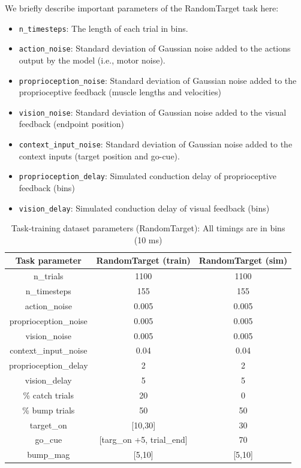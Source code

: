 \documentclass{article}
\begin{document}
We briefly describe important parameters of the RandomTarget task here:
\begin{itemize}
    \item \texttt{n\_timesteps}: The length of each trial in bins.
    \item \texttt{action\_noise}: Standard deviation of Gaussian noise added to the actions output by the model (i.e., motor noise).
    \item \texttt{proprioception\_noise}: Standard deviation of Gaussian noise added to the proprioceptive feedback (muscle lengths and velocities)
    \item \texttt{vision\_noise}: Standard deviation of Gaussian noise added to the visual feedback (endpoint position)
    \item \texttt{context\_input\_noise}: Standard deviation of Gaussian noise added to the context inputs (target position and go-cue).
    \item \texttt{proprioception\_delay}: Simulated conduction delay of proprioceptive feedback (bins)
    \item \texttt{vision\_delay}: Simulated conduction delay of visual feedback (bins)
\end{itemize}
\begin{table}[ht]
\centering
\begin{tabular}{|c|c|c|}
\hline
\textbf{Task parameter} & \textbf{RandomTarget (train)} & \textbf{RandomTarget (sim)}  \\ \hline
n\_trials &  1100 & 1100  \\ \hline
n\_timesteps &  155 & 155  \\ \hline
action\_noise & 0.005 & 0.005 \\ \hline
proprioception\_noise & 0.005 & 0.005 \\ \hline
vision\_noise & 0.005 & 0.005 \\ \hline
context\_input\_noise & 0.04 & 0.04 \\ \hline
proprioception\_delay & 2 & 2 \\ \hline
vision\_delay & 5 & 5 \\ \hline

\% catch trials & 20 & 0 \\ \hline
\% bump trials & 50 & 50 \\ \hline
target\_on & [10,30] & 30 \\ \hline
go\_cue & [targ\_on +5, trial\_end] & 70 \\ \hline
bump\_mag & [5,10] & [5,10] \\ \hline

\end{tabular}
\caption{Task-training dataset parameters (RandomTarget): All timings are in bins (10 ms)}
\label{table:RandomTargetTrain}
\end{table}
\end{document}
